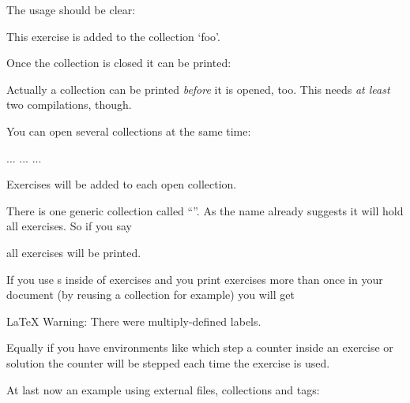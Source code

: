 \documentclass{xsim-manual}
\begin{document}
The usage should be clear:
\begin{example}
  \begin{exercise}
    This exercise is added to the collection `foo'.
  \end{exercise}
\end{example}
Once the collection is closed it can be printed:
\begin{example}
\end{example}
Actually a collection can be printed \emph{before} it is opened, too.  This
needs \emph{at least} two compilations, though.

You can open several collections at the same time:
\begin{sourcecode}
    ...
    ...
    ...
\end{sourcecode}
Exercises will be added to each open collection.

There is one generic collection called \enquote{}.  As the
name already suggests it will hold all exercises.  So if you say
\begin{sourcecode}
\end{sourcecode}
all exercises will be printed.

\begin{bewareofthedog}
  If you use s inside of exercises and you print exercises more
  than once in your document (by reusing a collection for example) you will
  get
\begin{sourcecode}
  LaTeX Warning: There were multiply-defined labels.
\end{sourcecode}
  Equally if you have environments like  which step a
  counter inside an exercise or solution the counter will be stepped each time
  the exercise is used.
\end{bewareofthedog}

At last now an example using external files, collections and tags:
\begin{sourcecode}

  

  
\end{sourcecode}
\end{document}
